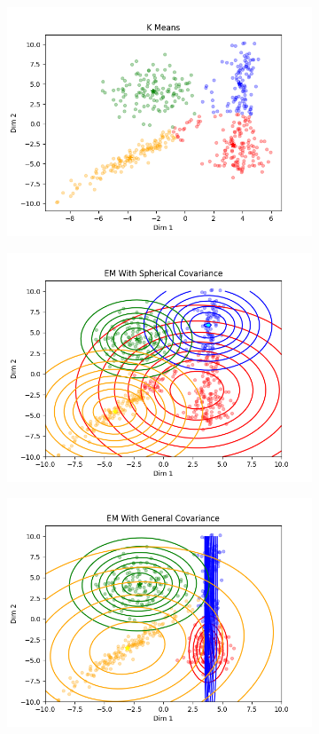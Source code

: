 \documentclass[paper=a4, fontsize=11pt]{scrartcl} %
\numberwithin{equation}{section} %
\numberwithin{figure}{section} %
\numberwithin{table}{section} %
\begin{document}
\begin{figure}
	\begin{subfigure}{.5\textwidth}
		\centering
		\includegraphics[width=.9\linewidth]{K_means_img.png}
	\end{subfigure}
	\begin{subfigure}{.5\textwidth}
		\centering
		\includegraphics[width=.9\linewidth]{EM_Spherical_img.png}
	\end{subfigure}
	\begin{subfigure}{.5\textwidth}
		\centering
		\includegraphics[width=.9\linewidth]{EM_General_img.png}

\end{subfigure}
\end{figure}
\end{document}
